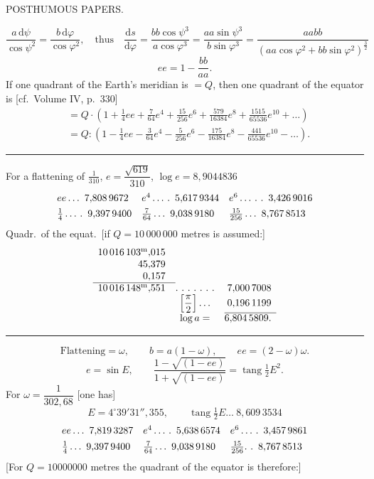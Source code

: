 \clearpage
{}\hfill POSTHUMOUS PAPERS.\hfill\mbox{}\par
\[
\frac{a\,\mathrm d\psi}{\cos\psi^2}=\frac{b\,\mathrm d\varphi}{\cos\varphi^2},\quad\text{thus}\quad\frac{\mathrm ds}{\mathrm d\varphi}=\frac{bb\cos\psi^3}{a\cos\varphi^3}=\frac{aa\sin\psi^3}{b\sin\varphi^3}=\frac{aabb}{(aa\cos\varphi^2+bb\sin\varphi^2)^{\frac32}}
\]
\[
ee=1-\frac{bb}{aa}.
\]
If one quadrant of the Earth's meridian is $=Q$, then one quadrant of the equator is [cf.\ Volume IV, p.\ 330]
\[
\begin{aligned}
&=Q\cdot(1+\tfrac14ee+\tfrac7{64}e^4+\tfrac{15}{256}e^6+\tfrac{579}{16384}e^8+\tfrac{1515}{65536}e^{10}+\ldots)\\
&=Q:(1-\tfrac14ee-\tfrac3{64}e^4-\tfrac5{256}e^6-\tfrac{175}{16384}e^8-\tfrac{441}{65536}e^{10}-\ldots).
\end{aligned}
\]
\begin{center}\rule{.25\textwidth}{.4pt}\end{center}
For a flattening of $\tfrac1{310}$, $e=\dfrac{\sqrt{619}}{310}$, $\log e=8{,}9044836$
\[
\begin{array}{l@{\quad}l@{\quad}l}
ee\ldots\ 7{,}808\,9672&e^4\ldots\,\ldotp\ 5{,}617\,9344&e^6\ldots\,\ldotp\,\ldotp\ 3{,}426\,9016\\[4pt]
\tfrac14\ldots\,\ldotp\ 9{,}397\,9400&\tfrac7{64}\ldots\ 9{,}038\,9180&\tfrac{15}{256}\ldots\ 8{,}767\,8513
\end{array}
\]
Quadr.\ of the equat.\ [if $Q=10\,000\,000$ metres is assumed:]
\[
\begin{array}{r@{\quad}c@{\quad}r}
10\,016\,103^{\mathrm m}{,}015&&\\
45{,}379&&\\
0{,}157&&\\\cline{1-1}
10\,016\,148^{\mathrm m}{,}551&\ldotp\,\ldotp\,\ldotp\,\ldotp\,\ldotp\,\ldotp\,\ldotp&7{,}000\,7008\\
&\left[\dfrac\pi2\right]\ldots&0{,}196\,1199\\\cline{3-3}
&\log a=&6{,}804\,5809.
\end{array}
\]
\begin{center}\rule{.25\textwidth}{.4pt}\end{center}
\[
\text{Flattening}=\omega,\qquad b=a(1-\omega),\qquad ee=(2-\omega)\omega.
\]
\[
e=\sin E,\qquad\frac{1-\sqrt{(1-ee)}}{1+\sqrt{(1-ee)}}=\operatorname{tang}\tfrac12E^2.
\]
For $\omega=\dfrac1{302{,}68}$ [one has]
\[
E=4^\circ39'31''{,}355,\qquad\operatorname{tang}\tfrac12E\ldots\ 8{,}609\,3534
\]
\[
\begin{array}{l@{\quad}l@{\quad}l}
ee\ldots\ 7{,}819\,3287&e^4\ldots\,\ldotp\ 5{,}638\,6574&e^6\ldots\,\ldotp\ 3{,}457\,9861\\[4pt]
\tfrac14\ldots\ 9{,}397\,9400&\tfrac7{64}\ldots\ 9{,}038\,9180&\tfrac{15}{256}\ldotp\,\ldotp\ 8{,}767\,8513
\end{array}
\]
[For $Q=10000000$ metres the quadrant of the equator is therefore:]

